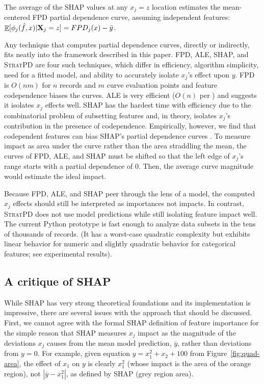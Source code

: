 \documentclass[11pt]{article}
\newcommand{\figref}[1]{Figure~\ref{#1}}
\newcommand{\todo}[1]{{{\small\color{red}{[#1]}}}}
\DeclareMathOperator{\Ex}{\mathbb{E}}
\newcommand{\spd}{\fontfamily{cmr}\textsc{\small StratPD}}
\begin{document}
\begin{theorem}\label{thm}
The average of the SHAP values at any $x_j=z$ location estimates the mean-centered FPD partial dependence curve, assuming independent features: $\Ex[ \phi_j(\hat{f},x) | {\bf X}_j = z] = FPD_j(x) - \bar{y}$.
\end{theorem}

Any technique that computes partial dependence curves, directly or indirectly, fits neatly into the framework described in this paper. FPD, ALE, SHAP, and \spd{} are four such techniques, which differ in efficiency, algorithm simplicity, need for a fitted model, and ability to accurately isolate $x_j$'s effect upon $y$. FPD is $O(nm)$ for $n$ records and $m$ curve evaluation points and feature codependence biases the curves. ALE is very efficient ($O(n)$ per \citealt{apley2016visualizing}) and \cite{interpML} suggests it isolates $x_j$ effects well.  SHAP has the hardest time with efficiency due to the combinatorial problem of subsetting features and, in theory, isolates $x_j$'s contribution in the presence of codependence. Empirically, however, we find that codependent features can bias SHAP's partial dependence curves \todo{as discussed where?}. To measure impact as area under the curve rather than the area straddling the mean, the curves of FPD, ALE, and SHAP must be shifted so that the left edge of $x_j$'s range starts with a partial dependence of 0. Then, the average curve magnitude would estimate the ideal impact. 

Because FPD, ALE, and SHAP peer through the lens of a model, the computed $x_j$ effects should still be interpreted as importances not impacts. In contrast, \spd{} does not use model predictions while still isolating feature impact well. The current Python prototype is fast enough to analyze data subsets in the tens of thousands of records. (It has a worst-case quadratic complexity but exhibits linear behavior for numeric and slightly quadratic behavior for categorical features; see experimental results).


\subsection{A critique of SHAP}

While SHAP has very strong theoretical foundations and its implementation is impressive, there are several issues with the approach that should be discussed.  First, we cannot agree with the formal SHAP definition of feature importance for the simple reason that SHAP measures $x_j$ impact as the magnitude of the deviations $x_j$ causes from the mean model prediction, $\overline{y}$, rather than deviations from $y=0$.   For example, given equation $y=x_1^2 + x_2 + 100$ from \figref{fig:quad-area}, the effect of $x_1$ on $y$ is clearly $x_1^2$ (whose impact is the area of the orange region), not $|\overline{y} - x_1^2|$, as defined by SHAP (grey region area). 
\end{document}
